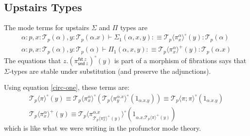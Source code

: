 \documentclass[10pt]{article}
\theoremstyle{definition}
\newcommand\dsd[1]{\ensuremath{\mathsf{#1}}}
\newcommand{\yields}{\vdash}
\newcommand\TrPlus[2]{\ensuremath{{#1}^+(#2)}}
\newcommand\TrCirc[2]{\ensuremath{{#1}^\circ(#2)}}
\newcommand\El[2]{\mathcal{T}_{#1}(#2)}
\newcommand\ApEl[2]{\mathcal{T}_{#1}\langle#2\rangle}
\newcommand{\app}[2]{\ensuremath{#1 \: #2}}
\newcommand{\fst}[1]{\app{\dsd{fst}}{#1}}
\newcommand{\snd}[1]{\app{\dsd{snd}}{#1}}
\begin{document}
\subsection{Upstairs Types}

The mode terms for upstairs $\Sigma$ and $\Pi$ types are
\begin{align*}
\alpha : p, x : \El{p}{\alpha}, y : \El{p}{\alpha.x} \yields \Sigma_1(\alpha,x,y) :\equiv \TrCirc{\ApEl{p}{\pi^\alpha_x}}{y}  : \El{p}{\alpha}\\
\alpha : p, x : \El{p}{\alpha}, y : \El{p}{\alpha} \yields \Pi_1(\alpha,x,y) :\equiv \TrPlus{\ApEl{p}{\pi^\alpha_x}}{y} : \El{p}{\alpha.x}
\end{align*}
The equations that $z.\TrCirc{(\pi^{\fst z}_{\snd{z}})}{y}$ is part of a
morphism of fibrations says that $\Sigma$-types are stable under
substitution (and preserve the adjunctions).

Using equation \eqref{circ-one}, these terms are:
\begin{align*}
\ApEl{p}{\pi}^\circ(y) \equiv \ApEl{p}{\pi^\alpha_x}^\circ(\ApEl{p}{\pi^{\alpha.x}_y}^\circ(1_{\alpha.x.y})) \equiv \ApEl{p}{\pi;\pi}^\circ(1_{\alpha.x.y}) \\
\ApEl{p}{\pi^\alpha_x}^+(y) \equiv \ApEl{p}{\pi^{\alpha.x}_{\ApEl{p}{\pi^\alpha_x}^+(y)}}^\circ(1_{\alpha.x.\ApEl{p}{\pi}^+(y)})
\end{align*}
which is like what we were writing in the profunctor mode theory.  
\end{document}
